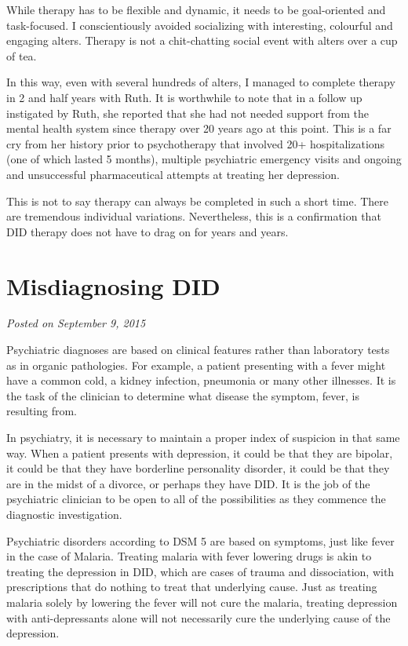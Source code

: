 \documentclass[]{book}
\begin{document}
While therapy has to be flexible and dynamic, it needs to be goal-oriented and task-focused. I conscientiously avoided socializing with interesting, colourful and engaging alters. Therapy is not a chit-chatting social event with alters over a cup of tea.

In this way, even with several hundreds of alters, I managed to complete therapy in 2 and half years with Ruth. It is worthwhile to note that in a follow up instigated by Ruth, she reported that she had not needed support from the mental health system since therapy over 20 years ago at this point. This is a far cry from her history prior to psychotherapy that involved 20+ hospitalizations (one of which lasted 5 months), multiple psychiatric emergency visits and ongoing and unsuccessful pharmaceutical attempts at treating her depression.

This is not to say therapy can always be completed in such a short time. There are tremendous individual variations. Nevertheless, this is a confirmation that DID therapy does not have to drag on for years and years.

\hypertarget{misdiagnosing-did}{%
\section{Misdiagnosing DID}\label{misdiagnosing-did}}

\emph{Posted on September 9, 2015}

Psychiatric diagnoses are based on clinical features rather than laboratory tests as in organic pathologies. For example, a patient presenting with a fever might have a common cold, a kidney infection, pneumonia or many other illnesses. It is the task of the clinician to determine what disease the symptom, fever, is resulting from.

In psychiatry, it is necessary to maintain a proper index of suspicion in that same way. When a patient presents with depression, it could be that they are bipolar, it could be that they have borderline personality disorder, it could be that they are in the midst of a divorce, or perhaps they have DID. It is the job of the psychiatric clinician to be open to all of the possibilities as they commence the diagnostic investigation.

Psychiatric disorders according to DSM 5 are based on symptoms, just like fever in the case of Malaria. Treating malaria with fever lowering drugs is akin to treating the depression in DID, which are cases of trauma and dissociation, with prescriptions that do nothing to treat that underlying cause. Just as treating malaria solely by lowering the fever will not cure the malaria, treating depression with anti-depressants alone will not necessarily cure the underlying cause of the depression.
\end{document}
